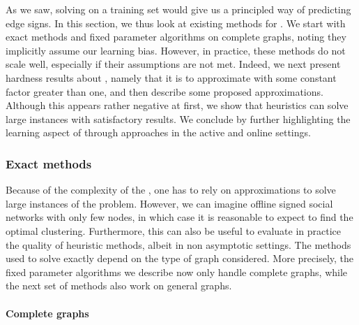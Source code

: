 As we saw, solving \pcc{} on a training set would give us a principled way of predicting edge signs.
In this section, we thus look at existing methods for \pcc{}. We start with exact methods and fixed
parameter algorithms on complete graphs, noting they implicitly assume our learning bias. However,
in practice, these methods do not scale well, especially if their assumptions are not met. Indeed,
we next present hardness results about \pcc{}, namely that it is \NPh{} to approximate with some
constant factor greater than one, and then describe some proposed approximations. Although this
appears rather negative at first, we show that heuristics can solve large instances with satisfactory
results. We conclude by further highlighting the learning aspect of \pcc{} through approaches in
the active and online settings.

\subsubsection{Exact methods}
\label{ssub:cc_exact_methods}

Because of the complexity of the \pcc{}, one has to rely on approximations to solve large instances
of the problem. However, we can imagine offline signed social networks with only few nodes, in which
case it is reasonable to expect to find the optimal clustering. Furthermore, this can also be useful
to evaluate in practice the quality of heuristic methods, albeit in non asymptotic settings. The
methods used to solve \pcc{} exactly depend on the type of graph considered. More precisely, the
fixed parameter algorithms we describe now only handle complete graphs, while the next set of
methods also work on general graphs.

\paragraph{Complete graphs}
\label{par:cc_editing}



